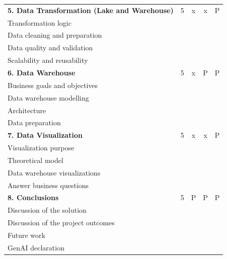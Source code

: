 \documentclass[11pt,a4paper]{article}
\begin{document}
\begin{table}[H]
\begin{tabular}{@{}p{8.5cm} c c c c@{}}
    \textbf{5. Data Transformation (Lake and Warehouse)}    & 5 & x & x & P \\
    \quad Transformation logic                              &   &   &   &   \\
    \quad Data cleaning and preparation                     &   &   &   &   \\
    \quad Data quality and validation                       &   &   &   &   \\
    \quad Scalability and reusability                       &   &   &   &   \\
    \addlinespace
    \textbf{6. Data Warehouse}                              & 5 & x & P & P \\
    \quad Business goals and objectives                     &   &   &   &   \\
    \quad Data warehouse modelling                          &   &   &   &   \\
    \quad Architecture                                      &   &   &   &   \\
    \quad Data preparation                                  &   &   &   &   \\
    \addlinespace
    \textbf{7. Data Visualization}                          & 5 & x & x & P \\
    \quad Visualization purpose                             &   &   &   &   \\
    \quad Theoretical model                                 &   &   &   &   \\
    \quad Data warehouse visualizations                     &   &   &   &   \\
    \quad Answer business questions                         &   &   &   &   \\
    \addlinespace
    \textbf{8. Conclusions}                                 & 5 & P & P & P \\
    \quad Discussion of the solution                        &   &   &   &   \\
    \quad Discussion of the project outcomes                &   &   &   &   \\
    \quad Future work                                       &   &   &   &   \\
    \quad GenAI declaration                                 &   &   &   &   \\
    \midrule
    \bottomrule
  \end{tabular}
\end{table}
\end{document}
